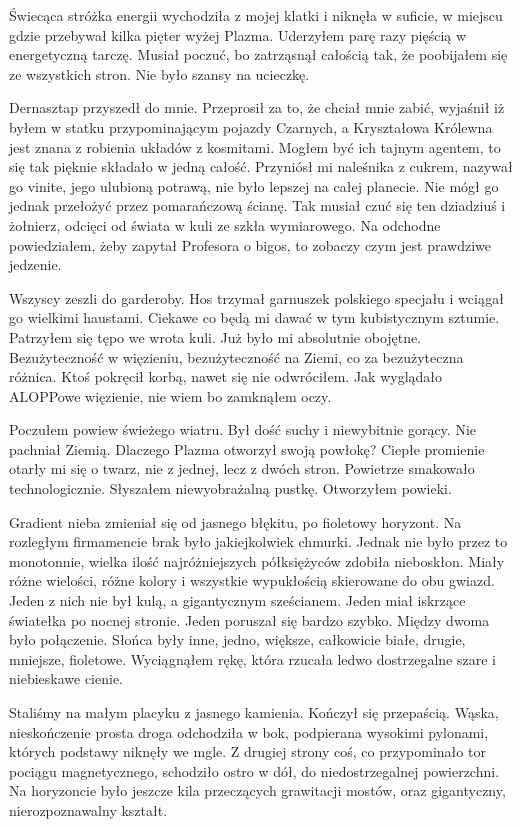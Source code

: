 Świecąca stróżka energii wychodziła z mojej klatki i niknęła w suficie, w miejscu gdzie przebywał kilka pięter wyżej Plazma.
Uderzyłem parę razy pięścią w energetyczną tarczę.
Musiał poczuć, bo zatrząsnął całością tak, że poobijałem się ze wszystkich stron.
Nie było szansy na ucieczkę.

Dernasztap przyszedł do mnie. Przeprosił za to, że chciał mnie zabić, wyjaśnił iż byłem w statku przypominającym pojazdy Czarnych, a
Kryształowa Królewna jest znana z robienia układów z kosmitami. Mogłem być ich tajnym agentem, to się tak pięknie składało w jedną całość.
Przyniósł mi naleśnika z cukrem, nazywał go vinite, jego ulubioną potrawą, nie było lepszej na całej planecie. 
Nie mógł go jednak przełożyć przez pomarańczową ścianę. 
Tak musiał czuć się ten dziadziuś i żołnierz, odcięci od świata w kuli ze szkła wymiarowego.
Na odchodne powiedziałem, żeby zapytał Profesora o bigos, to zobaczy czym jest prawdziwe jedzenie. 

Wszyscy zeszli do garderoby. Hos trzymał garnuszek polskiego specjału i wciągał go wielkimi haustami. Ciekawe co będą mi dawać w tym kubistycznym sztumie.
Patrzyłem się tępo we wrota kuli. Już było mi absolutnie obojętne. Bezużyteczność w więzieniu, bezużyteczność na Ziemi, co za bezużyteczna różnica.
Ktoś pokręcił korbą, nawet się nie odwróciłem.
Jak wyglądało ALOPPowe więzienie, nie wiem bo zamknąłem oczy.

Poczułem powiew świeżego wiatru.
Był dość suchy i niewybitnie gorący. Nie pachniał Ziemią.
Dlaczego Plazma otworzył swoją powłokę?
Ciepłe promienie otarły mi się o twarz, nie z jednej, lecz z dwóch stron.
Powietrze smakowało technologicznie.
Słyszałem niewyobrażalną pustkę.
Otworzyłem powieki.

Gradient nieba zmieniał się od jasnego błękitu, po fioletowy horyzont.
Na rozległym firmamencie brak było jakiejkolwiek chmurki.
Jednak nie było przez to monotonnie, wielka ilość najróżniejszych półksiężyców zdobiła nieboskłon.
Miały różne wielości, różne kolory i wszystkie wypukłością skierowane do obu gwiazd.
Jeden z nich nie był kulą, a gigantycznym sześcianem.
Jeden miał iskrzące światełka po nocnej stronie.
Jeden poruszał się bardzo szybko.
Między dwoma było połączenie.
Słońca były inne, jedno, większe, całkowicie białe, drugie, mniejsze, fioletowe.
Wyciągnąłem rękę, która rzucała ledwo dostrzegalne szare i niebieskawe cienie.

Staliśmy na małym placyku z jasnego kamienia. Kończył się przepaścią.
Wąska, nieskończenie prosta droga odchodziła w bok, podpierana wysokimi pylonami, których podstawy niknęły we mgle.
Z drugiej strony coś, co przypominało tor pociągu magnetycznego, schodziło ostro w dół, do niedostrzegalnej powierzchni.
Na horyzoncie było jeszcze kila przeczących grawitacji mostów, oraz gigantyczny, nierozpoznawalny kształt.

